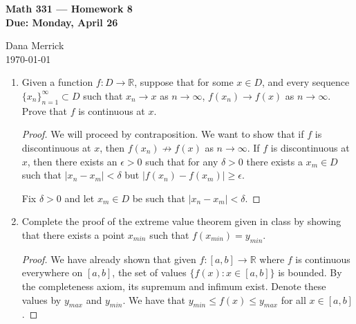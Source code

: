\documentclass[12pt]{amsart}
\begin{document}
\thispagestyle{empty}

\begin{center}
{\bf Math 331  --- Homework 8 \\
Due:  Monday, April 26}
\end{center}

\bigskip

\noindent
Dana Merrick \\
\today
\bigskip


\begin{enumerate}

\setlength{\itemsep}{6pt}

\item Given a function $f : D \rightarrow \mathbb{R}$, suppose that for some $x\in D$, and every sequence $\{x_n\}_{n=1}^\infty \subset D$ such that $x_n\rightarrow x$ as $n\rightarrow \infty$, $f(x_n)\rightarrow f(x)$ as $n\rightarrow \infty$.   Prove that $f$ is continuous at $x$.
%

\begin{proof}
We will proceed by contraposition. We want to show that if $f$ is discontinuous at $x$, then $f(x_n)\not\to f(x)$ as $n\to\infty$. If $f$ is discontinuous at $x$, then there exists an $\epsilon > 0$ such that for any $\delta >0$ there exists a $x_m\in D$ such that $|x_n -x_m| < \delta$ but $|f(x_n)-f(x_m)| \ge \epsilon$.

Fix $\delta >0$ and let $x_m\in D$ be such that $|x_n -x_m| < \delta$.
\end{proof}

\addtocounter{enumi}{1}
%
%

\item Complete the proof of the extreme value theorem given in class by showing that there exists a point $x_{min}$ such that $f(x_{min})= y_{min}$.  
%

\begin{proof}
We have already shown that given $f:[a,b]\to\mathbb R$ where $f$ is continuous everywhere on $[a,b]$, the set of values $\{ f(x) : x\in [a,b] \}$ is bounded. By the completeness axiom, its supremum and infimum exist. Denote these values by $y_{max}$ and $y_{min}$. We have that $y_{min} \le f(x) \le y_{max}$ for all $x\in[a,b]$.


\end{proof}
\end{enumerate}
\end{document}
